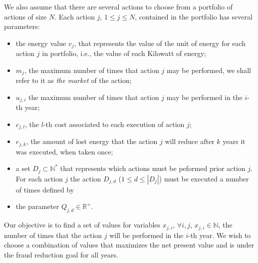 We also assume that there are several actions to choose from a portfolio of actions of size $N$.
Each action $j$, $1 \le j \le N$, contained in the portfolio has several parameters: 
\begin{itemize}
    \item the energy value $v_j$, that represents the value of the unit of energy for each action $j$ in portfolio,
    i.e., the value of each Kilowatt of energy;
    \item $m_j$, the maximum number of times that action $j$ may be performed, we
    shall refer to it as \textit{the market} of the action;
    \item $u_{j,i}$ the maximum number of times that action $j$ may be performed in the $i$-th year;
    \item $c_{j,l}$, the $l$-th cost associated to each execution of action $j$;
    \item $e_{j,k}$, the amount of lost energy that the action $j$ will reduce after 
    $k$ years it was executed, when taken once;
    \item a set $D_j \subset \mathbb{N^*}$ that represents which actions must be peformed prior action $j$.
    For each action $j$ the action $D_{j,d}$ ($1 \le d \le |D_j|$) must be executed a number of times defined by
    \item the parameter $Q_{j,d} \in \mathbb{R^+}$.
\end{itemize}

Our objective is to find a set of values for variables $x_{j,i}$, $\forall i,j$, $x_{j,i} \in \mathbb{N} $, 
the number of times that the action $j$ will be performed in the $i$-th year. We wish to choose a combination
of values that maximizes the net present value and is under the fraud reduction goal for all years. 

